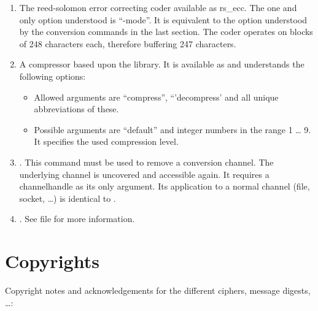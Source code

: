 \begin	{enumerate}
\item	The reed-solomon error correcting coder available as \cmd
	{rs\_ecc}. The one and only option understood is ``-mode''. It
	is equivalent to the option understood by the conversion
	commands in the last section. The coder operates on blocks of
	248 characters each, therefore buffering 247 characters.

\item	A compressor based upon the  library. It is
	available as  and understands the following options:

	\begin	{itemize}
	\item[-mode]	Allowed arguments are ``compress'',
			``'decompress' and all unique abbreviations of
			these.
	\item[-level]	Possible arguments are ``default'' and integer
			numbers in the range 1 \dots{} 9. It specifies
			the used compression level.
	\end	{itemize}

\item	{}. This command must be used to remove a
	conversion channel. The underlying channel is uncovered and
	accessible again. It requires a channelhandle as its only
	argument. Its application to a normal channel (file, socket,
	\dots {}) is identical to .

\item	{}. See file  for more
	information.
\end	{enumerate}

\chapter {Copyrights}\label {copyright}

Copyright notes and acknowledgements for the different ciphers,
message digests, \dots {}:

